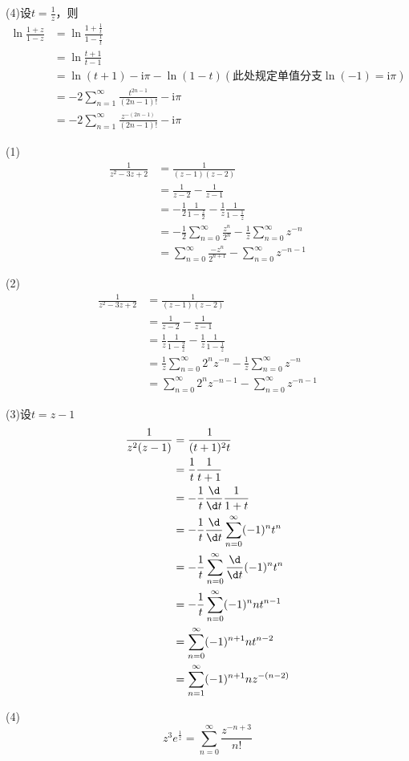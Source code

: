 \documentclass{phyasgn}
\renewcommand{\i}{\mathrm{i}}
\begin{document}
\begin{sol}[2]
    (4)设$t=\frac{1}{z}$，则
     \begin{align*}
       \ln\frac{1+z}{1-z}&=\ln\frac{1+\frac{1}{t}}{1-\frac{1}{t}}\\
       &=\ln\frac{t+1}{t-1}\\
       &=\ln(t+1)-\i \pi-\ln(1-t)(\text{此处规定单值分支}\ln(-1)=\i \pi)\\
       &=-2\sum_{n=1}^{\infty}\frac{t^{2n-1}}{(2n-1)!}-\i \pi\\
       &=-2\sum_{n=1}^{\infty}\frac{z^{-(2n-1)}}{(2n-1)!}-\i \pi
    \end{align*} 
\end{sol}\par

\begin{sol}[3]
    (1) \begin{align*}
        \frac{1}{z^2-3z+2}&=\frac{1}{(z-1)(z-2)}\\
        &=\frac{1}{z-2}-\frac{1}{z-1}\\
        &=-\frac{1}{2}\frac{1}{1-\frac{z}{2}}-\frac{1}{z}\frac{1}{1-\frac{1}{z}}\\
        &=-\frac{1}{2}\sum_{n=0}^{\infty}\frac{z^n}{2^n}-\frac{1}{z}\sum_{n=0}^{\infty}z^{-n}\\
        &=\sum_{n=0}^{\infty}\frac{-z^n}{2^{n+1}}-\sum_{n=0}^{\infty}z^{-n-1}
    \end{align*} 

    (2) \begin{align*}
        \frac{1}{z^2-3z+2}&=\frac{1}{(z-1)(z-2)}\\
        &=\frac{1}{z-2}-\frac{1}{z-1}\\
        &=\frac{1}{z}\frac{1}{1-\frac{2}{z}}-\frac{1}{z}\frac{1}{1-\frac{1}{z}}\\
        &=\frac{1}{z}\sum_{n=0}^{\infty}2^nz^{-n}-\frac{1}{z}\sum_{n=0}^{\infty}z^{-n}\\
        &=\sum_{n=0}^{\infty}2^nz^{-n-1}-\sum_{n=0}^{\infty}z^{-n-1}
    \end{align*} 

    (3)设$t=z-1$
     \begin{align*}
        \frac{1}{z^2(z-1)}&=\frac{1}{(t+1)^2t}\\
        &=\frac{1}{t}\frac{1}{t+1}\\
        &=-\frac{1}{t}\frac{\d}{\d t}\frac{1}{1+t}\\
        &=-\frac{1}{t}\frac{\d}{\d t}\sum_{n=0}^{\infty}(-1)^nt^n\\
        &=-\frac{1}{t}\sum_{n=0}^{\infty}\frac{\d}{\d t}(-1)^nt^n\\
        &=-\frac{1}{t}\sum_{n=0}^{\infty}(-1)^nnt^{n-1}\\
        &=\sum_{n=0}^{\infty}(-1)^{n+1}nt^{n-2}\\
        &=\sum_{n=1}^{\infty}(-1)^{n+1}nz^{-(n-2)}
    \end{align*} 

    (4)$$z^3e^{\frac{1}{z}}=\sum_{n=0}^{\infty}\frac{z^{-n+3}}{n!} $$
\end{sol}\par
\end{document}
